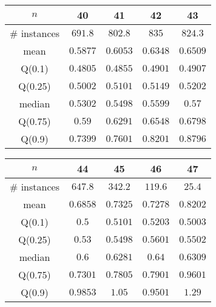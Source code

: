 \begin{tabular}{c|cccc} 
\hline 
$n$ & 40 & 41 & 42 & 43 \tabularnewline 
\hline 
\hline 
\# instances & $691.8$ & $802.8$ & $835$ & $824.3$ \tabularnewline 
mean & $0.5877$ & $0.6053$ & $0.6348$ & $0.6509$ \tabularnewline 
Q(0.1) & $0.4805$ & $0.4855$ & $0.4901$ & $0.4907$ \tabularnewline 
Q(0.25) & $0.5002$ & $0.5101$ & $0.5149$ & $0.5202$ \tabularnewline 
median & $0.5302$ & $0.5498$ & $0.5599$ & $0.57$ \tabularnewline 
Q(0.75) & $0.59$ & $0.6291$ & $0.6548$ & $0.6798$ \tabularnewline 
Q(0.9) & $0.7399$ & $0.7601$ & $0.8201$ & $0.8796$ \tabularnewline 
\hline 
\end{tabular} 
\medskip{} 

\begin{tabular}{c|cccc} 
\hline 
$n$ & 44 & 45 & 46 & 47 \tabularnewline 
\hline 
\hline 
\# instances & $647.8$ & $342.2$ & $119.6$ & $25.4$ \tabularnewline 
mean & $0.6858$ & $0.7325$ & $0.7278$ & $0.8202$ \tabularnewline 
Q(0.1) & $0.5$ & $0.5101$ & $0.5203$ & $0.5003$ \tabularnewline 
Q(0.25) & $0.53$ & $0.5498$ & $0.5601$ & $0.5502$ \tabularnewline 
median & $0.6$ & $0.6281$ & $0.64$ & $0.6309$ \tabularnewline 
Q(0.75) & $0.7301$ & $0.7805$ & $0.7901$ & $0.9601$ \tabularnewline 
Q(0.9) & $0.9853$ & $1.05$ & $0.9501$ & $1.29$ \tabularnewline 
\hline 
\end{tabular} 
\medskip{} 

